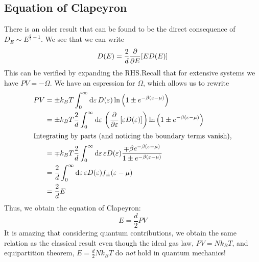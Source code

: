 \subsection{Equation of Clapeyron}
There is an older result that can be found to be the direct consequence of \(D_E\sim E^{\frac{d}{2}-1}\). We see that we can write
\[D(E) = \frac{2}{d}\frac{\partial }{\partial E}[ED(E)]\]
This can be verified by expanding the RHS.\@ Recall that for extensive systems we have \(PV=-\Omega\). We have an espression for \(\Omega\), which allows us to rewrite
\begin{align*}
	PV &=\pm k_BT\int_0^\infty \d{\varepsilon}D(\varepsilon)\ln \left(1\pm e^{-\beta(\varepsilon-\mu)}\right)\\
	   &=\pm k_BT\frac{2}{d}\int_0^\infty \d{\varepsilon}\left(\pder{}{\varepsilon}\left[\varepsilon D(\varepsilon)\right]\right)\ln \left(1\pm e^{-\beta(\varepsilon-\mu)}\right)\\
	   \intertext{Integrating by parts (and noticing the boundary terms vanish),}
	   &=\mp k_BT \frac{2}{d}\int_0^\infty \d{\varepsilon}\varepsilon D(\varepsilon)\frac{\mp \beta e^{-\beta(\varepsilon-\mu)}}{1\pm e^{-\beta(\varepsilon-\mu)}}\\
	   &=\frac{2}{d}\int_0^\infty \d{\varepsilon}\varepsilon D(\varepsilon)f_\pm(\varepsilon-\mu)\\
	   &=\frac{2}{d}E
\end{align*}
Thus, we obtain the equation of Clapeyron:
\[E= \frac{d}{2}PV\]
It is amazing that considering quantum contributions, we obtain the same relation as the classical result even though the ideal gas law, \(PV=Nk_BT\), and equipartition theorem, \(E=\frac{d}{2}Nk_BT\) do \emph{not} hold in quantum mechanics!

